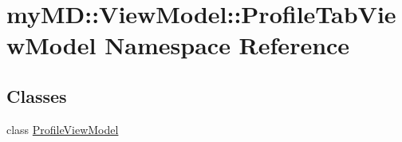 \hypertarget{namespacemy_m_d_1_1_view_model_1_1_profile_tab_view_model}{
\section{my\-MD::View\-Model::Profile\-Tab\-View\-Model Namespace Reference}
\label{d7/d97/namespacemy_m_d_1_1_view_model_1_1_profile_tab_view_model}
}


\subsection*{Classes}
\begin{CompactItemize}
\item 
class \hyperlink{classmy_m_d_1_1_view_model_1_1_profile_tab_view_model_1_1_profile_view_model}{Profile\-View\-Model}
\end{CompactItemize}

